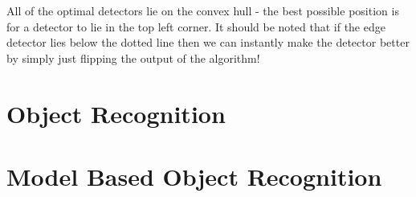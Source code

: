 \documentclass{article}
\begin{document}
	All of the optimal detectors lie on the convex hull - the best possible position is for a detector to lie in the top left corner. It should be noted that if the edge detector lies below the dotted line then we can instantly make the detector better by simply just flipping the output of the algorithm!
		
	\section{Object Recognition}

	\section{Model Based Object Recognition}
	\newpage
	\listoffigures
	\printindex
\end{document}
